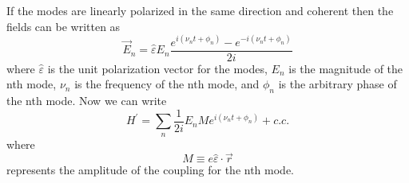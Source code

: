 If the modes are linearly polarized in the same direction and coherent then the fields can be written as
\begin{equation}
\vec{E}_n
=
\hat{\varepsilon} E_n
\frac
{e^{i (\nu_n t + \phi_n)} - e^{-i (\nu_n t + \phi_n)}}
{2 i}
\end{equation}
where $\hat{\varepsilon}$ is the unit polarization vector for the modes, $E_n$ is the magnitude of the nth mode, $\nu_n$ is the frequency of the nth mode, and $\phi_n$ is the arbitrary phase of the nth mode. Now we can write
\begin{equation}
H^{\prime}
=
\sum_{n}
\frac{1}{2 i}
E_n M
e^{i (\nu_n t + \phi_n)}
+
c.c.
\label{interaction}
\end{equation}
where
\begin{equation}
M\equiv e \hat{\varepsilon} \cdot \vec{r}
\end{equation}
represents the amplitude of the coupling for the nth mode.

